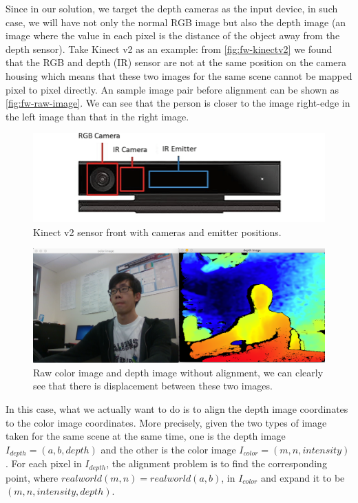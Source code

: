 Since in our solution, we target the depth cameras as the input device, in such
case, we will have not only the normal RGB image but also the depth image (an
image where the value in each pixel is the distance of the object away from the
depth sensor). Take Kinect v2 as an example: from \autoref{fig:fw-kinectv2} we
found that the RGB and depth (IR) sensor are not at the same
position on the camera housing which means that these two images for the same scene cannot be mapped 
pixel to pixel directly. 
An sample image pair before alignment can be shown as 
\autoref{fig:fw-raw-image}. We can see that the person is closer to the image
right-edge in the left image than that in the right image.

\begin{figure}
    \includegraphics[width=\linewidth]{figures/framework_kinectv2.png}
    \caption{Kinect v2 sensor front with cameras and emitter positions.}
    \label{fig:fw-kinectv2}
\end{figure}

\begin{figure}
    \includegraphics[width=\linewidth]{figures/framework_raw_images.png}
    \caption[Example without alignment]
    {Raw color image and depth image without alignment, we can clearly
        see that there is displacement between these two images.}
    \label{fig:fw-raw-image}
\end{figure}

In this case, what we actually want to do is to align the depth image coordinates to the 
color image coordinates. More precisely, given the two types of image taken
for the same scene at the same time, one is the depth image $I_{depth} = (a, b,
depth)$ and the other is the color image $I_{color} = (m, n, intensity)$. For
each pixel in $I_{depth}$, the alignment problem is to find the corresponding point, where
$realworld(m, n) = realworld(a, b)$, in
$I_{color}$ and expand it to be $(m, n, intensity, depth)$.

